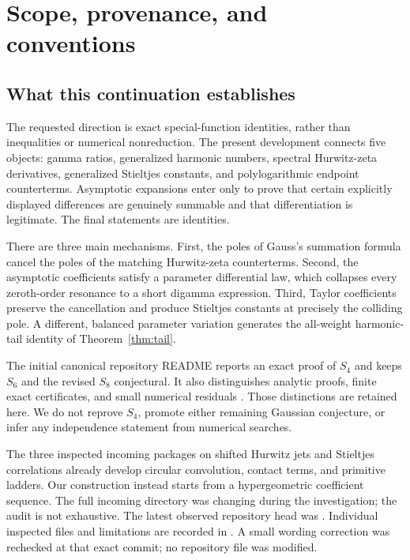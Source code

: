 \section{Scope, provenance, and conventions}\label{sec:scope}

\subsection{What this continuation establishes}
The requested direction is exact special-function identities, rather than
inequalities or numerical nonreduction.  The present development connects
five objects: gamma ratios, generalized harmonic numbers, spectral
Hurwitz-zeta derivatives, generalized Stieltjes constants, and polylogarithmic
endpoint counterterms.  Asymptotic expansions enter only to prove that
certain explicitly displayed differences are genuinely summable and
that differentiation is legitimate.  The final statements are identities.

There are three main mechanisms.  First, the poles of Gauss's summation
formula cancel the poles of the matching Hurwitz-zeta counterterms.
Second, the asymptotic coefficients satisfy a parameter differential law,
which collapses every zeroth-order resonance to a short digamma expression.
Third, Taylor coefficients preserve the cancellation and produce Stieltjes
constants at precisely the colliding pole.  A different, balanced parameter
variation generates the all-weight harmonic-tail identity of
Theorem~\ref{thm:tail}.

The initial canonical repository README reports an exact proof of $S_4$
and keeps $S_6$ and the revised $S_8$ conjectural.  It also distinguishes
analytic proofs, finite exact certificates, and small numerical residuals
\cite{repo-readme}.  Those distinctions are retained here.  We do not
reprove $S_4$, promote either remaining Gaussian conjecture, or infer any
independence statement from numerical searches.

The three inspected incoming packages on shifted Hurwitz jets and
Stieltjes correlations already develop circular convolution, contact terms,
and primitive ladders.  Our construction instead starts from a
hypergeometric coefficient sequence.  The full incoming directory was
changing during the investigation; the audit is not exhaustive.  The latest
observed repository head was
.
Individual inspected files and limitations are recorded in
.  A small wording correction was rechecked at
that exact commit; no repository file was modified.

